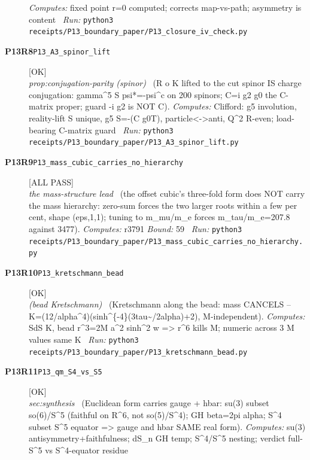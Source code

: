 \begin{description}
\emph{Computes:} fixed point r=0 computed; corrects map-vs-path; asymmetry is content
\ \emph{Run:} \texttt{python3 receipts/P13\_boundary\_paper/P13\_closure\_iv\_check.py}
\item[\rcptlabel{P13_A3_spinor_lift}{P13R8}\textbf{P13R8}\quad\texttt{P13\_A3\_spinor\_lift}]\hfill\textsf{[OK]}\\
\textit{prop:conjugation-parity (spinor)} \ (R o K lifted to the cut spinor IS charge conjugation: gamma\textasciicircum{}5 S psi*=-psi\textasciicircum{}c on 200 spinors; C=i g2 g0 the C-matrix proper; guard -i g2 is NOT C). 
\emph{Computes:} Clifford: g5 involution, reality-lift S unique, g5 S=-(C g0T), particle<->anti, Q\textasciicircum{}2 R-even; load-bearing C-matrix guard
\ \emph{Run:} \texttt{python3 receipts/P13\_boundary\_paper/P13\_A3\_spinor\_lift.py}
\item[\rcptlabel{P13_mass_cubic_carries_no_hierarchy}{P13R9}\textbf{P13R9}\quad\texttt{P13\_mass\_cubic\_carries\_no\_hierarchy}]\hfill\textsf{[ALL PASS]}\\
\textit{the mass-structure lead} \ (the offset cubic's three-fold form does NOT carry the mass hierarchy: zero-sum forces the two larger roots within a few per cent, shape (eps,1,1); tuning to m\_mu/m\_e forces m\_tau/m\_e=207.8 against 3477). 
\emph{Computes:} r3791
 \emph{Bound:} 59
\ \emph{Run:} \texttt{python3 receipts/P13\_boundary\_paper/P13\_mass\_cubic\_carries\_no\_hierarchy.py}
\item[\rcptlabel{P13_kretschmann_bead}{P13R10}\textbf{P13R10}\quad\texttt{P13\_kretschmann\_bead}]\hfill\textsf{[OK]}\\
\textit{(bead Kretschmann)} \ (Kretschmann along the bead: mass CANCELS -- K=(12/alpha\textasciicircum{}4)(sinh\textasciicircum{}\{-4\}(3tau\textasciitilde{}/2alpha)+2), M-independent). 
\emph{Computes:} SdS K, bead r\textasciicircum{}3=2M a\textasciicircum{}2 sinh\textasciicircum{}2 w => r\textasciicircum{}6 kills M; numeric across 3 M values same K
\ \emph{Run:} \texttt{python3 receipts/P13\_boundary\_paper/P13\_kretschmann\_bead.py}
\item[\rcptlabel{P13_qm_S4_vs_S5}{P13R11}\textbf{P13R11}\quad\texttt{P13\_qm\_S4\_vs\_S5}]\hfill\textsf{[OK]}\\
\textit{sec:synthesis} \ (Euclidean form carries gauge + hbar: su(3) subset so(6)/S\textasciicircum{}5 (faithful on R\textasciicircum{}6, not so(5)/S\textasciicircum{}4); GH beta=2pi alpha; S\textasciicircum{}4 subset S\textasciicircum{}5 equator => gauge and hbar SAME real form). 
\emph{Computes:} su(3) antisymmetry+faithfulness; dS\_n GH temp; S\textasciicircum{}4/S\textasciicircum{}5 nesting; verdict full-S\textasciicircum{}5 vs S\textasciicircum{}4-equator residue

\end{description}
